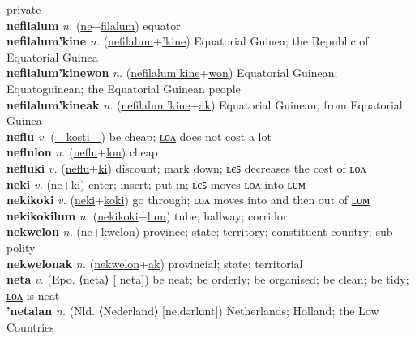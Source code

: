 private \label{nehulon} \\
\textbf{nefilalum} \textit{n.} (\hyperref[ne]{ne}+\hyperref[filalum]{filalum})
equator \label{nefilalum} \\
\textbf{nefilalum'kine} \textit{n.} (\hyperref[nefilalum]{nefilalum}+\hyperref['kine]{'kine})
Equatorial Guinea; the Republic of Equatorial Guinea \label{nefilalum'kine} \\
\textbf{nefilalum'kinewon} \textit{n.} (\hyperref[nefilalum'kine]{nefilalum'kine}+\hyperref[won]{won})
Equatorial Guinean; Equatoguinean; the Equatorial Guinean people \label{nefilalum'kinewon} \\
\textbf{nefilalum'kineak} \textit{n.} (\hyperref[nefilalum'kine]{nefilalum'kine}+\hyperref[ak]{ak})
Equatorial Guinean; from Equatorial Guinea \label{nefilalum'kineak} \\
\textbf{neflu} \textit{v.} (\hyperref[kosti]{~~kosti~~})
be cheap; \hyperref[neflulon]{ʟᴏᴧ} does not cost a lot \label{neflu} \\
\textbf{neflulon} \textit{n.} (\hyperref[neflu]{neflu}+\hyperref[lon]{lon})
cheap \label{neflulon} \\
\textbf{nefluki} \textit{v.} (\hyperref[neflu]{neflu}+\hyperref[ki]{ki})
discount; mark down; ʟєꜱ decreases the cost of ʟᴏᴧ \label{nefluki} \\
\textbf{neki} \textit{v.} (\hyperref[ne]{ne}+\hyperref[ki]{ki})
enter; insert; put in; ʟєꜱ moves ʟᴏᴧ into ʟᴜᴍ \label{neki} \\
\textbf{nekikoki} \textit{v.} (\hyperref[neki]{neki}+\hyperref[koki]{koki})
go through; ʟᴏᴧ moves into and then out of \hyperref[nekikokilum]{ʟᴜᴍ} \label{nekikoki} \\
\textbf{nekikokilum} \textit{n.} (\hyperref[nekikoki]{nekikoki}+\hyperref[lum]{lum})
tube; hallway; corridor \label{nekikokilum} \\
\textbf{nekwelon} \textit{n.} (\hyperref[ne]{ne}+\hyperref[kwelon]{kwelon})
province; state; territory; constituent country; sub-polity \label{nekwelon} \\
\textbf{nekwelonak} \textit{n.} (\hyperref[nekwelon]{nekwelon}+\hyperref[ak]{ak})
provincial; state; territorial \label{nekwelonak} \\
\textbf{neta} \textit{v.} (Epo. ⟨neta⟩ [ˈneta])
be neat; be orderly; be organised; be clean; be tidy; \hyperref[netalon]{ʟᴏᴧ} is neat \label{neta} \\
\textbf{'netalan} \textit{n.} (Nld. ⟨Nederland⟩ [neːdərlɑnt])
Netherlands; Holland; the Low Countries \label{'netalan} \\
